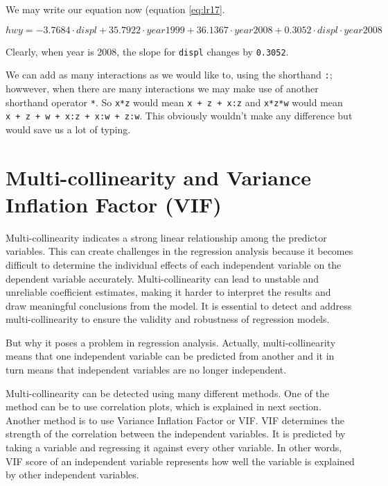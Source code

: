\documentclass[
]{book}
\begin{document}
We may write our equation now (equation \eqref{eq:lr17}.

\begin{equation} 
{hwy} = -3.7684\cdot{displ} + 35.7922\cdot{year1999} + 36.1367\cdot{year2008} + 0.3052\cdot{displ}\cdot{year2008}
\label{eq:lr17}
\end{equation}

Clearly, when year is 2008, the slope for \texttt{displ} changes by \texttt{0.3052}.

We can add as many interactions as we would like to, using the shorthand \texttt{:}; howwever, when there are many interactions we may make use of another shorthand operator \texttt{*}. So \texttt{x*z} would mean \texttt{x\ +\ z\ +\ x:z} and \texttt{x*z*w} would mean \texttt{x\ +\ z\ +\ w\ +\ x:z\ +\ x:w\ +\ z:w}. This obviously wouldn't make any difference but would save us a lot of typing.

\hypertarget{multi-collinearity-and-variance-inflation-factor-vif}{%
\section{Multi-collinearity and Variance Inflation Factor (VIF)}\label{multi-collinearity-and-variance-inflation-factor-vif}}

Multi-collinearity indicates a strong linear relationship among the predictor variables. This can create challenges in the regression analysis because it becomes difficult to determine the individual effects of each independent variable on the dependent variable accurately. Multi-collinearity can lead to unstable and unreliable coefficient estimates, making it harder to interpret the results and draw meaningful conclusions from the model. It is essential to detect and address multi-collinearity to ensure the validity and robustness of regression models.

But why it poses a problem in regression analysis. Actually, multi-collinearity means that one independent variable can be predicted from another and it in turn means that independent variables are no longer independent.

Multi-collinearity can be detected using many different methods. One of the method can be to use correlation plots, which is explained in next section. Another method is to use Variance Inflation Factor or VIF. VIF determines the strength of the correlation between the independent variables. It is predicted by taking a variable and regressing it against every other variable. In other words, VIF score of an independent variable represents how well the variable is explained by other independent variables.
\end{document}
